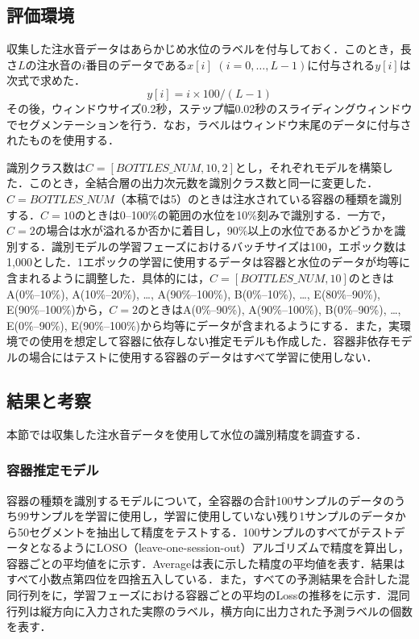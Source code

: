 \documentclass[submit,techrep,noauthor]{ipsj}
\begin{document}
\subsection{評価環境}
収集した注水音データはあらかじめ水位のラベルを付与しておく．このとき，長さ$L$の注水音の$i$番目のデータである$x[i]$ $(i=0,\dots,L-1)$に付与される$y[i]$は次式で求めた．
\begin{equation}
  y[i]=i \times 100/(L-1)
\end{equation}
その後，ウィンドウサイズ0.2秒，ステップ幅0.02秒のスライディングウィンドウでセグメンテーションを行う．なお，ラベルはウィンドウ末尾のデータに付与されたものを使用する．\par

識別クラス数は$C=[BOTTLES\_NUM,10,2]$とし，それぞれモデルを構築した．このとき，全結合層の出力次元数を識別クラス数と同一に変更した．$C=BOTTLES\_NUM$（本稿では5）のときは注水されている容器の種類を識別する．$C=10$のときは0--100\%の範囲の水位を10\%刻みで識別する．一方で，$C=2$の場合は水が溢れるか否かに着目し，90\%以上の水位であるかどうかを識別する．識別モデルの学習フェーズにおけるバッチサイズは100，エポック数は1,000とした．1エポックの学習に使用するデータは容器と水位のデータが均等に含まれるように調整した．具体的には，$C=[BOTTLES\_NUM,10]$のときはA(0\%--10\%), A(10\%--20\%), \dots, A(90\%--100\%), B(0\%--10\%), \dots, E(80\%--90\%), E(90\%--100\%)から，$C=2$のときはA(0\%--90\%), A(90\%--100\%), B(0\%--90\%), \dots, E(0\%--90\%), E(90\%--100\%)から均等にデータが含まれるようにする．また，実環境での使用を想定して容器に依存しない推定モデルも作成した．容器非依存モデルの場合にはテストに使用する容器のデータはすべて学習に使用しない．


\subsection{結果と考察}
本節では収集した注水音データを使用して水位の識別精度を調査する．

\subsubsection{容器推定モデル}
容器の種類を識別するモデルについて，全容器の合計100サンプルのデータのうち99サンプルを学習に使用し，学習に使用していない残り1サンプルのデータから50セグメントを抽出して精度をテストする．100サンプルのすべてがテストデータとなるようにLOSO（leave-one-session-out）アルゴリズムで精度を算出し，容器ごとの平均値をに示す．Averageは表に示した精度の平均値を表す．結果はすべて小数点第四位を四捨五入している．また，すべての予測結果を合計した混同行列をに，学習フェーズにおける容器ごとの平均のLossの推移をに示す．混同行列は縦方向に入力された実際のラベル，横方向に出力された予測ラベルの個数を表す．\par
\end{document}
